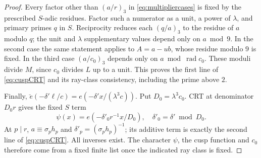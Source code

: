\documentclass[11pt,a4paper]{article}
\numberwithin{equation}{section}
\theoremstyle{definition}
\theoremstyle{remark}
\newcommand{\rad}{\operatorname{rad}}
\newcommand{\ve}{\breve e}
\begin{document}
\begin{proof}
Every factor other than $(a/r)_3$ in \eqref{eq:multipliercases} is fixed by the prescribed $S$-adic residues. Factor such a numerator as a unit, a power of $\lambda$, and primary primes $q$ in $S$. Reciprocity reduces each $(q/a)_3$ to the residue of $a$ modulo $q$; the unit and $\lambda$ supplementary values depend only on $a\bmod9$. In the second case the same statement applies to $A=a-ub$, whose residue modulo $9$ is fixed. In the third case $(a/c_0)_3$ depends only on $a\bmod\rad c_0$. These moduli divide $M$, since $c_0$ divides $L$ up to a unit. This proves the first line of \eqref{eq:cuspCRT} and its ray-class consistency, including the prime above $2$.

Finally, $\ve(-\delta'\ell/c)=e(-\delta'x/(\lambda^3c))$. Put $D_0=\lambda^3c_0$. CRT at denominator $D_0r$ gives the fixed $S$ term
\[
 \psi(x)=e(-\delta'_0r^{-1}x/D_0),\quad \delta'_0=\delta'\bmod D_0.
\]
At $p\mid r$, $a\equiv\sigma_ph_p$ and $\delta'_p=(\sigma_ph_p)^{-1}$; its additive term is exactly the second line of \eqref{eq:cuspCRT}. All inverses exist. The character $\psi$, the cusp function and $c_0$ therefore come from a fixed finite list once the indicated ray class is fixed.
\end{proof}
\end{document}
